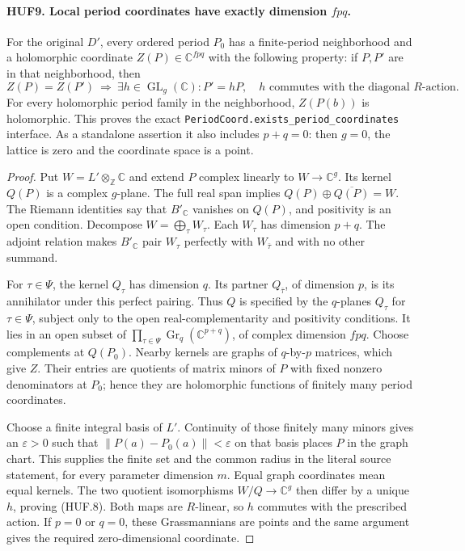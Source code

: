 \paragraph{HUF9. Local period coordinates have exactly dimension \(fpq\).}
\label{claim:HUF9}
For the original \(D'\), every ordered period \(P_0\)
has a finite-period neighborhood and a holomorphic
coordinate \(Z(P)\in\mathbb C^{fpq}\) with the following
property: if \(P,P'\) are in that neighborhood, then
\[
 Z(P)=Z(P')\ \Longrightarrow\
 \exists h\in\operatorname{GL}_g(\mathbb C):
          P'=hP,\quad h\text{ commutes with the diagonal }R\text{-action}.
 \tag{HUF.8}
\]
For every holomorphic period family in the neighborhood,
\(Z(P(b))\) is holomorphic.  This proves the exact
\texttt{PeriodCoord.exists\_period\_coordinates} interface.
As a standalone assertion it also includes \(p+q=0\):
then \(g=0\), the lattice is zero and the coordinate
space is a point.

\begin{proof}
Put \(W=L'\otimes_{\mathbb Z}\mathbb C\) and extend \(P\)
complex linearly to \(W\to\mathbb C^g\).
Its kernel \(Q(P)\) is a complex \(g\)-plane.
The full real span implies
\(Q(P)\oplus\overline{Q(P)}=W\).
The Riemann identities say that \(B'_\mathbb C\) vanishes
on \(Q(P)\), and positivity is an open condition.
Decompose \(W=\bigoplus_\tau W_\tau\).
Each \(W_\tau\) has dimension \(p+q\).
The adjoint relation makes \(B'_\mathbb C\) pair
\(W_\tau\) perfectly with \(W_{\bar\tau}\) and with
no other summand.

For \(\tau\in\Psi\), the kernel \(Q_\tau\) has dimension
\(q\).  Its partner \(Q_{\bar\tau}\), of dimension \(p\),
is its annihilator under this perfect pairing.
Thus \(Q\) is specified by the \(q\)-planes \(Q_\tau\)
for \(\tau\in\Psi\), subject only to the open
real-complementarity and positivity conditions.
It lies in an open subset of
\(\prod_{\tau\in\Psi}\operatorname{Gr}_q(\mathbb C^{p+q})\),
of complex dimension \(fpq\).
Choose complements at \(Q(P_0)\).  Nearby kernels are
graphs of \(q\)-by-\(p\) matrices, which give \(Z\).
Their entries are quotients of matrix minors of \(P\)
with fixed nonzero denominators at \(P_0\); hence they
are holomorphic functions of finitely many period
coordinates.

Choose a finite integral basis of \(L'\).
Continuity of those finitely many minors gives an
\(\varepsilon>0\) such that
\(\|P(a)-P_0(a)\|<\varepsilon\) on that basis places
\(P\) in the graph chart.  This supplies the finite
set and the common radius in the literal source
statement, for every parameter dimension \(m\).
Equal graph coordinates mean equal kernels.  The
two quotient isomorphisms \(W/Q\to\mathbb C^g\)
then differ by a unique \(h\), proving (HUF.8).
Both maps are \(R\)-linear, so \(h\) commutes with
the prescribed action.  If \(p=0\) or \(q=0\),
these Grassmannians are points and the same argument
gives the required zero-dimensional coordinate.
\end{proof}

